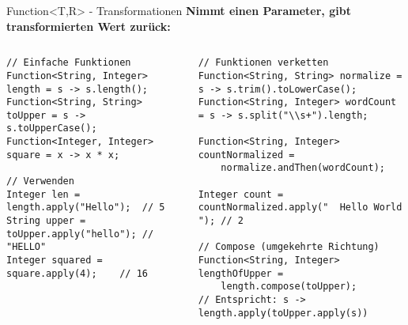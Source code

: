 \begin{frame}[fragile]{Function<T,R> - Transformationen}
  \textbf{Nimmt einen Parameter, gibt transformierten Wert zurück:}

  \begin{columns}[T]
    \begin{lstlisting}[style=java, basicstyle=\tiny\ttfamily]
// Einfache Funktionen
Function<String, Integer> length = s -> s.length();
Function<String, String> toUpper = s -> s.toUpperCase();
Function<Integer, Integer> square = x -> x * x;

// Verwenden
Integer len = length.apply("Hello");  // 5
String upper = toUpper.apply("hello"); // "HELLO"
Integer squared = square.apply(4);    // 16
    \end{lstlisting}

    \begin{lstlisting}[style=java, basicstyle=\tiny\ttfamily]
// Funktionen verketten
Function<String, String> normalize = s -> s.trim().toLowerCase();
Function<String, Integer> wordCount = s -> s.split("\\s+").length;

Function<String, Integer> countNormalized =
    normalize.andThen(wordCount);

Integer count = countNormalized.apply("  Hello World  "); // 2

// Compose (umgekehrte Richtung)
Function<String, Integer> lengthOfUpper =
    length.compose(toUpper);
// Entspricht: s -> length.apply(toUpper.apply(s))
    \end{lstlisting}
  \end{columns}
\end{frame}

